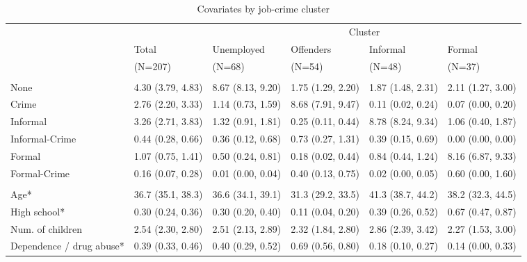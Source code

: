 
\renewcommand{\arraystretch}{0.8}
\begin{scriptsize}
{\setlength{\tabcolsep}{5pt}
\begin{longtable}{llllll} 
\caption{Covariates by job-crime cluster}%
 \label{tab:desc_job_crime_clusters}\\
\hline
\addlinespace
& & \multicolumn{4}{c}{Cluster} \\
\addlinespace
\cmidrule(lr){3-6} 
\addlinespace
& \multicolumn{1}{l}{Total} & \multicolumn{1}{l}{Unemployed} & \multicolumn{1}{l}{Offenders} & \multicolumn{1}{l}{Informal} & \multicolumn{1}{l}{Formal} \\
& \multicolumn{1}{l}{(N=207)} & \multicolumn{1}{l}{(N=68)} & \multicolumn{1}{l}{(N=54)} & \multicolumn{1}{l}{(N=48)} & \multicolumn{1}{l}{(N=37)} \\
\addlinespace[8pt]
\hline
\addlinespace[12pt]
\multicolumn{6}{l}{\textbf{Time spent on job (months)}} \\
\addlinespace
\quad None & 4.30 (3.79, 4.83) & 8.67 (8.13, 9.20) & 1.75 (1.29, 2.20) & 1.87 (1.48, 2.31) & 2.11 (1.27, 3.00) \\ 
  \quad Crime & 2.76 (2.20, 3.33) & 1.14 (0.73, 1.59) & 8.68 (7.91, 9.47) & 0.11 (0.02, 0.24) & 0.07 (0.00, 0.20) \\ 
  \quad Informal & 3.26 (2.71, 3.83) & 1.32 (0.91, 1.81) & 0.25 (0.11, 0.44) & 8.78 (8.24, 9.34) & 1.06 (0.40, 1.87) \\ 
  \quad Informal-Crime & 0.44 (0.28, 0.66) & 0.36 (0.12, 0.68) & 0.73 (0.27, 1.31) & 0.39 (0.15, 0.69) & 0.00 (0.00, 0.00) \\ 
  \quad Formal & 1.07 (0.75, 1.41) & 0.50 (0.24, 0.81) & 0.18 (0.02, 0.44) & 0.84 (0.44, 1.24) & 8.16 (6.87, 9.33) \\ 
  \quad Formal-Crime & 0.16 (0.07, 0.28) & 0.01 (0.00, 0.04) & 0.40 (0.13, 0.75) & 0.02 (0.00, 0.05) & 0.60 (0.00, 1.60) \\ 
  \addlinespace[12pt]
\multicolumn{6}{l}{\textbf{Covariates (average)*}} \\
\addlinespace
\quad Age* & 36.7 (35.1, 38.3) & 36.6 (34.1, 39.1) & 31.3 (29.2, 33.5) & 41.3 (38.7, 44.2) & 38.2 (32.3, 44.5) \\ 
  \quad High school* & 0.30 (0.24, 0.36) & 0.30 (0.20, 0.40) & 0.11 (0.04, 0.20) & 0.39 (0.26, 0.52) & 0.67 (0.47, 0.87) \\ 
  \quad Num. of children & 2.54 (2.30, 2.80) & 2.51 (2.13, 2.89) & 2.32 (1.84, 2.80) & 2.86 (2.39, 3.42) & 2.27 (1.53, 3.00) \\ 
  \quad Dependence / drug abuse* & 0.39 (0.33, 0.46) & 0.40 (0.29, 0.52) & 0.69 (0.56, 0.80) & 0.18 (0.10, 0.27) & 0.14 (0.00, 0.33) \\ 

\end{longtable}}
\end{scriptsize}
